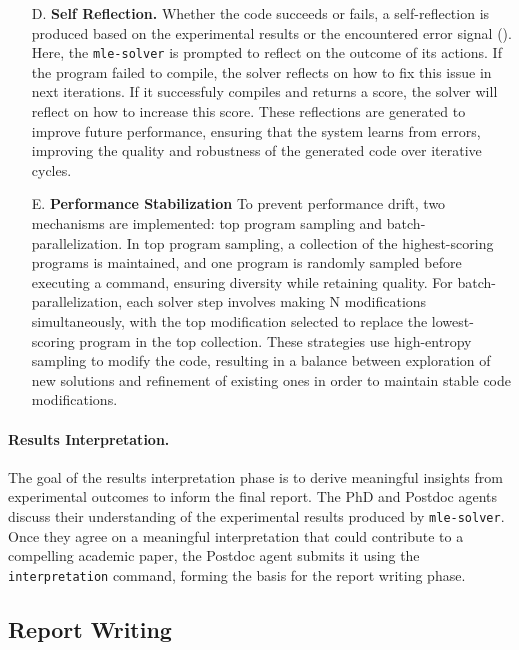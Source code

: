 \documentclass[11pt, a4paper]{gdm_format}
\begin{document}
\begin{enumerate}
    \item [D.] \textbf{Self Reflection.} Whether the code succeeds or fails, a self-reflection is produced based on the experimental results or the encountered error signal (\cite{shinn2024reflexion,renze2024self}). Here, the \texttt{mle-solver} is prompted to reflect on the outcome of its actions. If the program failed to compile, the solver reflects on how to fix this issue in next iterations. If it successfuly compiles and returns a score, the solver will reflect on how to increase this score. These reflections are generated to improve future performance, ensuring that the system learns from errors, improving the quality and robustness of the generated code over iterative cycles.
    \item [E.] \textbf{Performance Stabilization} To prevent performance drift, two mechanisms are implemented: top program sampling and batch-parallelization. In top program sampling, a collection of the highest-scoring programs is maintained, and one program is randomly sampled before executing a command, ensuring diversity while retaining quality. For batch-parallelization, each solver step involves making N modifications simultaneously, with the top modification selected to replace the lowest-scoring program in the top collection. These strategies use high-entropy sampling to modify the code, resulting in a balance between exploration of new solutions and refinement of existing ones in order to maintain stable code modifications. 
\end{enumerate}




\paragraph{Results Interpretation.} The goal of the results interpretation phase is to derive meaningful insights from experimental outcomes to inform the final report. The PhD and Postdoc agents discuss their understanding of the experimental results produced by \texttt{mle-solver}. Once they agree on a meaningful interpretation that could contribute to a compelling academic paper, the Postdoc agent submits it using the \texttt{interpretation} command, forming the basis for the report writing phase.



\subsection{Report Writing} 
\label{sec:report_writing}
\end{document}
